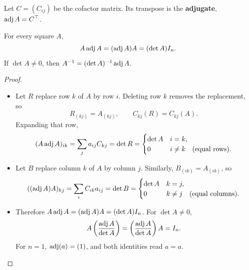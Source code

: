 Let \(C=(C_{ij})\) be the cofactor
matrix. Its transpose is the \textbf{adjugate}, \(\operatorname{adj} A=C^\top\).

\begin{proposition}\label{prop:05:adjugate}
For every square \(A\),
\[
A\operatorname{adj} A=(\operatorname{adj} A)A=(\det A)I_n.
\]
If \(\det A\ne0\), then \(A^{-1}=(\det A)^{-1}\operatorname{adj} A\).
\end{proposition}
\begin{proof}
\begin{itemize}
\item Let \(R\) replace row \(k\) of \(A\) by row \(i\).
  Deleting row \(k\) removes the replacement, so
  \[
  R_{(kj)}=A_{(kj)},\qquad C_{kj}(R)=C_{kj}(A).
  \]
  Expanding that row,
  \[
  (A\operatorname{adj} A)_{ik}=\sum_j a_{ij}C_{kj}
   =\det R=\begin{cases}\det A&i=k,\\0&i\ne k\quad\text{(equal rows)}.\end{cases}
  \]
\item Let \(B\) replace column \(k\) of \(A\) by column \(j\).
  Similarly, \(B_{(ik)}=A_{(ik)}\), so
  \[
  ((\operatorname{adj} A)A)_{kj}=\sum_i C_{ik}a_{ij}
   =\det B=\begin{cases}\det A&k=j,\\0&k\ne j\quad\text{(equal columns)}.\end{cases}
  \]
\item Therefore \(A\operatorname{adj} A=(\operatorname{adj} A)A=(\det A)I_n\). For \(\det A\ne0\),
  \[
  A\left(\frac{\operatorname{adj} A}{\det A}\right)
   =\left(\frac{\operatorname{adj} A}{\det A}\right)A=I_n.
  \]
  For \(n=1\), \(\operatorname{adj}(a)=(1)\), and both identities read \(a=a\).
\end{itemize}
\end{proof}

